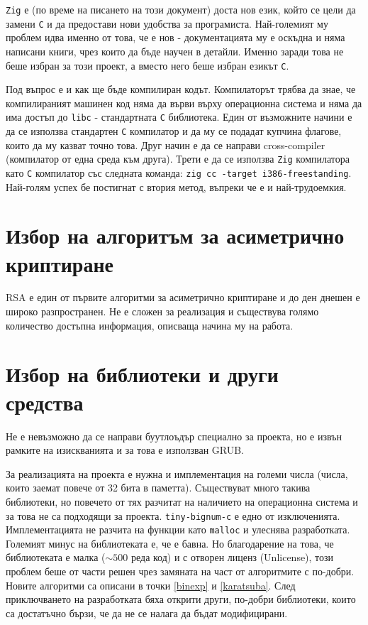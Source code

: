 {\tt Zig} е (по време на писането на този документ) доста нов език, който се цели да замени {\tt C} и да предостави нови удобства за програмиста.\cite{whyzig} Най-големият му проблем идва именно от това, че е нов - документацията му е оскъдна и няма написани книги, чрез които да бъде научен в детайли. Именно заради това не беше избран за този проект, а вместо него беше избран езикът {\tt C}.

Под въпрос е и как ще бъде компилиран кодът. Компилаторът трябва да знае, че компилираният машинен код няма да върви върху операционна система и няма да има достъп до {\tt libc} - стандартната {\tt C} библиотека. Един от възможните начини е да се използва стандартен {\tt C} компилатор и да му се подадат купчина флагове, които да му казват точно това. Друг начин е да се направи cross-compiler (компилатор от една среда към друга). Трети е да се използва {\tt Zig} компилатора като {\tt C} компилатор със следната команда:
{\tt zig cc -target i386-freestanding}.
Най-голям успех бе постигнат с втория метод, въпреки че е и най-трудоемкия.

\section{Избор на алгоритъм за асиметрично криптиране}
RSA е един от първите алгоритми за асиметрично криптиране и до ден днешен е широко разпространен. Не е сложен за реализация и съществува голямо количество достъпна информация, описваща начина му на работа.\cite{artoftheproblemrsa, rsapaper}

\section{Избор на библиотеки и други средства}
Не е невъзможно да се направи буутлоъдър специално за проекта, но е извън рамките на изискванията и за това е използван GRUB.

За реализацията на проекта е нужна и имплементация на големи числа (числа, които заемат повече от 32 бита в паметта). Съществуват много такива библиотеки, но повечето от тях разчитат на наличието на операционна система и за това не са подходящи за проекта. {\tt tiny-bignum-c}\cite{tinybignumc} е едно от изключенията. Имплементацията не разчита на функции като {\tt malloc} и улеснява разработката. Големият минус на библиотеката е, че е бавна. Но благодарение на това, че библиотеката е малка ($\sim 500$ реда код) и с отворен лиценз (Unlicense), този проблем беше от части решен чрез замяната на част от алгоритмите с по-добри. Новите алгоритми са описани в точки \ref{binexp} и \ref{karatsuba}. След приключването на разработката бяха открити други, по-добри библиотеки\cite{tomsfastmath, bignum-embedded}, които са достатъчно бързи, че да не се налага да бъдат модифицирани.


